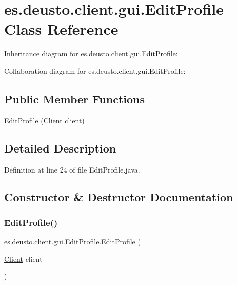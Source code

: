\hypertarget{classes_1_1deusto_1_1client_1_1gui_1_1_edit_profile}{}\section{es.\+deusto.\+client.\+gui.\+Edit\+Profile Class Reference}
\label{classes_1_1deusto_1_1client_1_1gui_1_1_edit_profile}


Inheritance diagram for es.\+deusto.\+client.\+gui.\+Edit\+Profile\+:


Collaboration diagram for es.\+deusto.\+client.\+gui.\+Edit\+Profile\+:
\subsection*{Public Member Functions}
\begin{DoxyCompactItemize}
\item 
\mbox{\hyperlink{classes_1_1deusto_1_1client_1_1gui_1_1_edit_profile_a0302d5f1a2df66b4e4ce357ec32015bd}{Edit\+Profile}} (\mbox{\hyperlink{classes_1_1deusto_1_1client_1_1_client}{Client}} client)
\end{DoxyCompactItemize}


\subsection{Detailed Description}


Definition at line 24 of file Edit\+Profile.\+java.



\subsection{Constructor \& Destructor Documentation}
\mbox{\label{classes_1_1deusto_1_1client_1_1gui_1_1_edit_profile_a0302d5f1a2df66b4e4ce357ec32015bd}} 
\subsubsection{\texorpdfstring{EditProfile()}{EditProfile()}}
{\footnotesize\ttfamily es.\+deusto.\+client.\+gui.\+Edit\+Profile.\+Edit\+Profile (\begin{DoxyParamCaption}\item[{\mbox{\hyperlink{classes_1_1deusto_1_1client_1_1_client}{Client}}}]{client }\end{DoxyParamCaption})}

